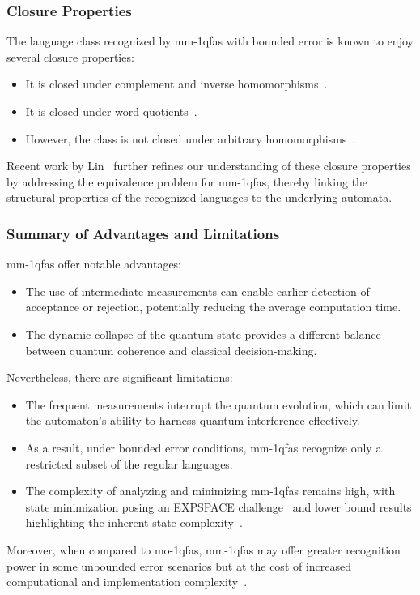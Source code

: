 \subsubsection{Closure Properties}
The language class recognized by \glspl{mm-1qfa} with bounded error is known to enjoy several closure properties:
\begin{itemize}
    \item It is closed under complement and inverse homomorphisms~\cite{brodsky2002characterizations}.
    \item It is closed under word quotients~\cite{brodsky2002characterizations}.
    \item However, the class is not closed under arbitrary homomorphisms~\cite{kondacs1997power,bertoni2003quantum}.
\end{itemize}
Recent work by Lin~\cite{lin2012another} further refines our understanding of these closure properties by addressing the equivalence problem for \glspl{mm-1qfa}, thereby linking the structural properties of the recognized languages to the underlying automata.

\subsubsection{Summary of Advantages and Limitations}
\glspl{mm-1qfa} offer notable advantages:
\begin{itemize}
    \item The use of intermediate measurements can enable earlier detection of acceptance or rejection, potentially reducing the average computation time.
    \item The dynamic collapse of the quantum state provides a different balance between quantum coherence and classical decision-making.
\end{itemize}
Nevertheless, there are significant limitations:
\begin{itemize}
    \item The frequent measurements interrupt the quantum evolution, which can limit the automaton’s ability to harness quantum interference effectively.
    \item As a result, under bounded error conditions, \glspl{mm-1qfa} recognize only a restricted subset of the regular languages.
    \item The complexity of analyzing and minimizing \glspl{mm-1qfa} remains high, with state minimization posing an EXPSPACE challenge~\cite{mateus2012complexity} and lower bound results highlighting the inherent state complexity~\cite{ablayev2000lower}.
\end{itemize}
Moreover, when compared to \gls{mo-1qfa}s, \glspl{mm-1qfa} may offer greater recognition power in some unbounded error scenarios but at the cost of increased computational and implementation complexity~\cite{kondacs1997power,berzicna2001ambainis}.

